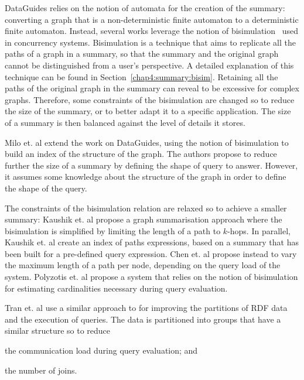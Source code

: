 DataGuides relies on the notion of automata for the creation of the summary: converting a graph that is a non-deterministic finite automaton to a deterministic finite automaton. Instead, several works leverage the notion of bisimulation~\cite{park:1981:cai} used in concurrency systems.
Bisimulation is a technique that aims to replicate all the paths of a graph in a summary, so that the summary and the original graph cannot be distinguished from a user's perspective. A detailed explanation of this technique can be found in Section~\ref{chap4:summary:bisim}.
Retaining all the paths of the original graph in the summary can reveal to be excessive for complex graphs. Therefore, some constraints of the bisimulation are changed so to reduce the size of the summary, or to better adapt it to a specific application. The size of a summary is then balanced against the level of details it stores.

Milo et. al \cite{Milo:1999:ISP:645503.656266} extend the work on DataGuides, using the notion of bisimulation to build an index of the structure of the graph. The authors propose to reduce further the size of a summary by defining the shape of query to answer. However, it assumes some knowledge about the structure of the graph in order to define the shape of the query.

The constraints of the bisimulation relation are relaxed so to achieve a smaller summary: Kaushik et. al \cite{kaushik:de:2002} propose a graph summarisation approach where the bisimulation is simplified by limiting the length of a path to $k$-hops. In parallel, Kaushik et. al \cite{kaushik:2002:cib} create an index of paths expressions, based on a summary that has been built for a pre-defined query expression.
Chen et. al \cite{chen:2003:dia} propose instead to vary the maximum length of a path per node, depending on the query load of the system. Polyzotis et. al \cite{polyzotis:2006:xsx} propose a system that relies on the notion of bisimulation for estimating cardinalities necessary during query evaluation.

Tran et. al \cite{Tran:2012:kde} use a similar approach to \cite{kaushik:2002:cib} for improving the partitions of RDF data and the execution of queries. The data is partitioned into groups that have a similar structure so to reduce
\begin{inparaenum}[(a)]
\item the communication load during query evaluation; and
\item the number of joins.
\end{inparaenum}

